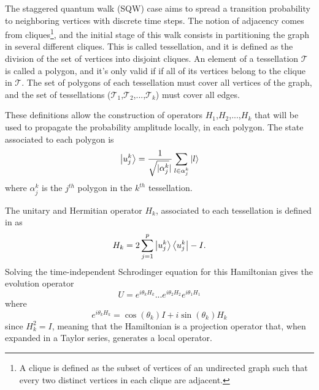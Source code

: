 \documentclass[../../dissertation.tex]{subfiles}
\begin{document}
The staggered quantum walk (SQW) case aims to spread a transition probability to
neighboring vertices with discrete time steps. The notion of adjacency comes
from cliques\footnote{A clique is defined as the subset of vertices of an
	undirected graph such that every two distinct vertices in each clique
are adjacent.}, and the initial stage of this walk consists in partitioning the
graph in several different cliques. This is called tessellation, and it is
defined as the division of the set of vertices into disjoint cliques. An
element of a tessellation $\mathscr{T}$ is called a polygon, and it's only
valid if if all of its vertices belong to the clique in $\mathscr{T}$. The set
of polygons of each tessellation must cover all vertices of the graph, and the
set of tessellations
($\mathscr{T}_{1}$,$\mathscr{T}_{2}$,...,$\mathscr{T}_{k}$) must cover all
edges.\par 

These definitions allow the construction of operators $H_1$,$H_2$,...,$H_k$
that will be used to propagate the probability amplitude locally, in each
polygon. The state associated to each polygon is
\begin{equation}
	\ket{u_{j}^{k}} = \frac{1}{\sqrt{\mathopen|\alpha_{j}^{k}}\mathclose|}\sum_{l\in\alpha_{j}^{k}}\ket{l}
\end{equation}
where $\alpha_{j}^{k}$ is the $j^{th}$ polygon in the $k^{th}$ tessellation.\par

The unitary and Hermitian operator $H_k$, associated to each tessellation is
defined in \cite{portugal2017b} as
\begin{equation}
	H_k = 2\sum_{j=1}^{p}\ket{u_{j}^{k}}\bra{u_{j}^{k}} - I.
	\label{eq:StagHamil}
\end{equation}
Solving the time-independent Schrodinger equation for this Hamiltonian gives
the evolution operator 
\begin{equation}
	U = e^{i\theta_{k}H_{k}}...e^{i\theta_{2}H_{2}}e^{i\theta_{1}H_{1}}
	\label{eq:stagWalkUnmodOp}
\end{equation}
where
\begin{equation}
	e^{i\theta_{k}H_{k}} = \cos{(\theta_k)}I + i\sin{(\theta_k)}H_k
\end{equation}
since $H_k^2 = I$, meaning that the Hamiltonian is a projection operator that,
when expanded in a Taylor series, generates a local operator.\par
\end{document}
